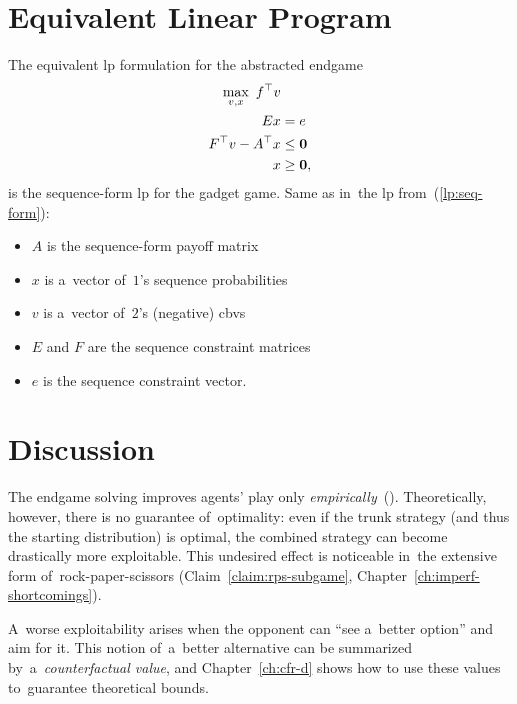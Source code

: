 \section{Equivalent Linear Program}
The equivalent \acrshort{lp} formulation for the abstracted endgame
\begin{equation*}
  \label{lp:endgame-solving}
  \begin{split}
    \max_{v, x}\  f^\top v & \\
    Ex &= e \\
    F^\top v - A^\top x &\le \boldsymbol{0} \\
    x &\ge \boldsymbol{0},
  \end{split}
\end{equation*}
is the sequence-form \acrshort{lp} for the gadget game.
Same as in~the \acrshort{lp} from~(\ref{lp:seq-form}):
\begin{itemize}
  \item $A$ is the sequence-form payoff matrix
  \item $x$ is a~vector of~$1$'s sequence probabilities
  \item $v$ is a~vector of~$2$'s (negative) \acrlong{cbv}s
  \item $E$ and $F$ are the sequence constraint matrices 
  \item $e$ is the sequence constraint vector.
\end{itemize}

\section{Discussion}
The endgame solving improves agents' play only \emph{empirically}~(\cite[Table~1]{Ganzfried2015endgame}).
Theoretically, however, there is no guarantee of~optimality:
even if the trunk strategy (and thus the starting distribution) is optimal, the combined strategy can become drastically more exploitable.
This undesired effect is noticeable in~the extensive form of~rock-paper-scissors (Claim~\ref{claim:rps-subgame}, Chapter~\ref{ch:imperf-shortcomings}).

A~worse exploitability arises when the opponent can ``see a~better option'' and aim for it.
This notion of~a~better alternative can be summarized by~a~\emph{counterfactual value}, and Chapter~\ref{ch:cfr-d} shows how to use these values to~guarantee theoretical bounds.
